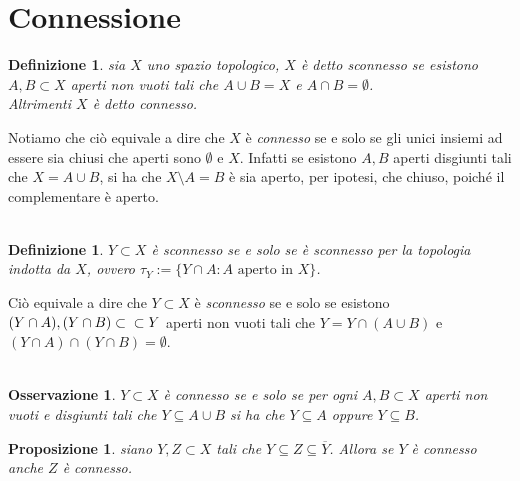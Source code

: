 \documentclass[oneside, 11pt]{amsbook}
\newcommand{\0}{{(0)}}
\newcommand{\3}{{(3)}}
\theoremstyle{colonplain}
\newtheorem{prop}[thm]{Proposizione}
\theoremstyle{colondefinition}
\newtheorem{defn}[thm]{Definizione}
\theoremstyle{colonremark}
\newtheorem{rmk}[thm]{Osservazione}
\numberwithin{equation}{chapter}
\begin{document}
\section{Connessione}
\begin{defn}
sia $X$ uno spazio topologico, $X$ è detto \textit{sconnesso} se esistono $A, B \subset X$ aperti non vuoti tali che $A \cup B = X$ e $A \cap B = \emptyset$. \\ Altrimenti $X$ è detto \textit{connesso}.
\end{defn}
Notiamo che ciò equivale a dire che $X$ è \textit{connesso} se e solo se gli unici insiemi ad essere sia chiusi che aperti sono $\emptyset$ e $X$. Infatti se esistono $A, B$ aperti disgiunti tali che $X = A \cup B$, si ha che $X \setminus A = B$ è sia aperto, per ipotesi, che chiuso, poiché il complementare è aperto. \\ \\
\begin{defn}
$Y \subset X$ è \textit{sconnesso} se e solo se è sconnesso per la topologia indotta da $X$, ovvero $\tau_Y := \{ Y \cap A : A \text{ aperto in } X \}$.
\end{defn}
Ciò equivale a dire che $Y \subset X$ è \textit{sconnesso} se e solo se esistono $(Y \cap A), (Y \cap B) \subset\\\subset Y$ aperti non vuoti tali che $Y = Y \cap (A \cup B)$ e $(Y \cap A) \cap (Y \cap B) = \emptyset$. \\ \\
\begin{rmk}
$Y \subset X$ è \textit{connesso} se e solo se per ogni $A, B \subset X$ aperti non vuoti e disgiunti tali che $Y \subseteq A \cup B$ si ha che $Y \subseteq A$ oppure $Y \subseteq B$.
\end{rmk}
\begin{prop}
siano $Y, Z \subset X$ tali che $Y \subseteq Z \subseteq \overline{Y}$. Allora se $Y$ è connesso anche $Z$ è connesso.
\end{prop}
\end{document}

